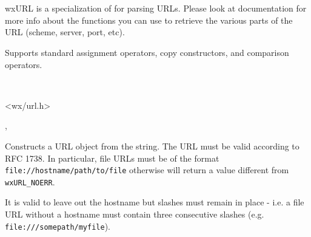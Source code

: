 \section{}\label{wxurl}

wxURL is a specialization of  for parsing URLs.
Please look at  documentation for more info about the functions
you can use to retrieve the various parts of the URL (scheme, server, port, etc).

Supports standard assignment operators, copy constructors,
and comparison operators.


\\


<wx/url.h>




, 



\label{wxurlctor}


Constructs a URL object from the string.  The URL must be valid according
to RFC 1738.  In particular, file URLs must be of the format
{\tt file://hostname/path/to/file} otherwise 
will return a value different from {\tt wxURL\_NOERR}.

It is valid to leave out the hostname but slashes must remain in place - 
i.e. a file URL without a hostname must contain three consecutive slashes 
(e.g. {\tt file:///somepath/myfile}).



\label{wxurldtor}


